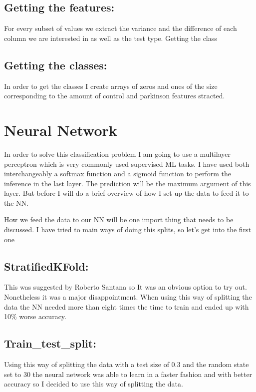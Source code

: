 \documentclass{article} %
\begin{document}
\bigskip
\bigskip

\subsection*{Getting the features:}

For every subset of values we extract the variance and the difference of each column we are interested in as well as the test type. 
Getting the class

\subsection*{Getting the classes:}
In order to get the classes I create arrays of zeros and ones of the size corresponding to the amount of control and parkinson features stracted.

\bigskip
\bigskip
\bigskip
\bigskip
\section{Neural Network}

In order to solve this classification problem I am going to use a multilayer perceptron which is very commonly used supervised ML tasks. I have used both interchangeably a softmax function and a sigmoid function to perform the inference in the last layer. The prediction will be the maximum argument of this layer.
But before I will do a brief overview of how I set up the data to feed it to the NN.


How we feed the data to our NN will be one import thing that needs to be discussed. I have tried to main ways of doing this splits, so let's get into the first one

\subsection*{StratifiedKFold:}

This was suggested by  Roberto Santana so It was an obvious option to try out. Nonetheless it was a major disappointment. When using this way of splitting the data the NN needed more than eight times the time to train and ended up with 10\% worse accuracy.
\subsection*{Train\_test\_split:}

Using this way of splitting the data with a test size of 0.3 and the random state set to 30 the neural network was able to learn in a faster fashion and with better accuracy so I decided to use this way of splitting the data.
\end{document}
